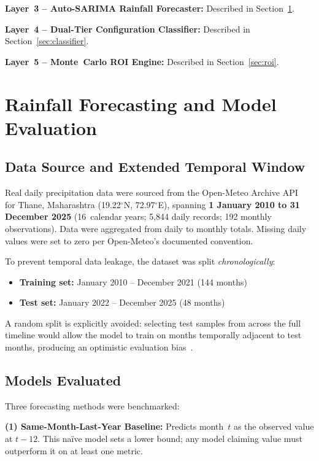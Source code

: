﻿\documentclass[conference]{IEEEtran}
\begin{document}
\textbf{Layer~3 -- Auto-SARIMA Rainfall Forecaster:}
Described in Section~\ref{sec:rainfall}.

\textbf{Layer~4 -- Dual-Tier Configuration Classifier:}
Described in Section~\ref{sec:classifier}.

\textbf{Layer~5 -- Monte~Carlo ROI Engine:}
Described in Section~\ref{sec:roi}.

\section{Rainfall Forecasting and Model Evaluation}
\label{sec:rainfall}

\subsection{Data Source and Extended Temporal Window}

Real daily precipitation data were sourced from the Open-Meteo Archive API~\cite{openmeteo} for Thane, Maharashtra (19.22$^\circ$N, 72.97$^\circ$E), spanning \textbf{1 January 2010 to 31 December 2025} (16~calendar years; 5,844 daily records; 192 monthly observations). Data were aggregated from daily to monthly totals. Missing daily values were set to zero per Open-Meteo's documented convention.

To prevent temporal data leakage, the dataset was split \textit{chronologically}:
\begin{itemize}
  \item \textbf{Training set:} January 2010 -- December 2021 (144 months)
  \item \textbf{Test set:} January 2022 -- December 2025 (48 months)
\end{itemize}
A random split is explicitly avoided: selecting test samples from across the full timeline would allow the model to train on months temporally adjacent to test months, producing an optimistic evaluation bias~\cite{chen2021}.

\subsection{Models Evaluated}

Three forecasting methods were benchmarked:

\textbf{(1) Same-Month-Last-Year Baseline:} Predicts month~$t$ as the observed value at $t - 12$. This na\"ive model sets a lower bound; any model claiming value must outperform it on at least one metric.
\end{document}

